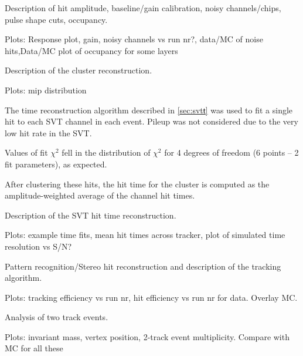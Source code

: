 \vspace{1cm}{\bf Calibration [Omar]}


Description of hit amplitude, baseline/gain calibration, noisy channels/chips, pulse shape cuts, occupancy. 

Plots: Response plot, gain, noisy channels vs run nr?, data/MC of noise hits,Data/MC plot of occupancy for some layers  

\vspace{1cm}{\bf Cluster reconstruction [Omar]}


Description of the cluster reconstruction.

Plots: mip distribution

\vspace{1cm}{\bf SVT timing [Sho]}

The time reconstruction algorithm described in \ref{sec:svtŧ} was used to fit a single hit to each SVT channel in each event.
Pileup was not considered due to the very low hit rate in the SVT.

Values of fit $\chi^2$ fell in the distribution of $\chi^2$ for 4 degrees of freedom (6 points -- 2 fit parameters), as expected.

After clustering these hits, the hit time for the cluster is computed as the amplitude-weighted average of the channel hit times. 

Description of the SVT hit time reconstruction. 

Plots: example time fits, mean hit times across tracker, plot of simulated time resolution vs S/N? 

\vspace{1cm}{\bf Tracking algorithms [Matt/Omar]}


Pattern recognition/Stereo hit reconstruction and description of the tracking algorithm. 

 Plots: tracking efficiency vs run nr, hit efficiency vs run nr for data. Overlay MC.
 
\vspace{1cm}{\bf Tracking algorithms [Matt]}


Analysis of two track events. 

Plots: invariant mass, vertex position, 2-track event multiplicity. Compare with MC for all these 
